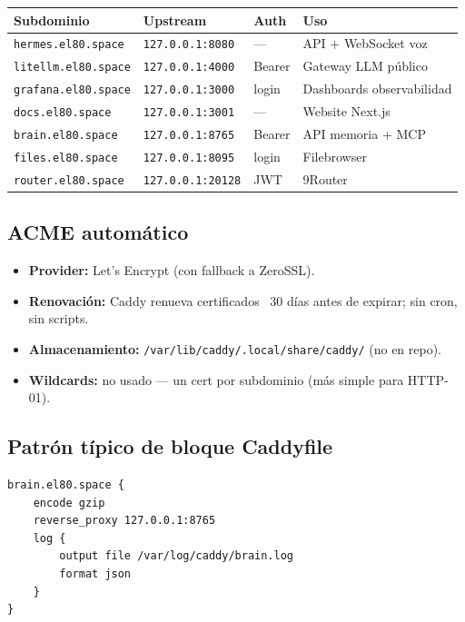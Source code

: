 \documentclass[11pt,a4paper]{article}
\begin{document}
\begin{center}
\begin{tabular}{|l|l|l|l|}
\hline
\rowcolor{hermesblue}\color{white}\textbf{Subdominio} & \color{white}\textbf{Upstream} & \color{white}\textbf{Auth} & \color{white}\textbf{Uso}\\
\hline
\texttt{hermes.el80.space} & \texttt{127.0.0.1:8080} & — & API + WebSocket voz\\
\texttt{litellm.el80.space} & \texttt{127.0.0.1:4000} & Bearer & Gateway LLM público\\
\texttt{grafana.el80.space} & \texttt{127.0.0.1:3000} & login & Dashboards observabilidad\\
\texttt{docs.el80.space} & \texttt{127.0.0.1:3001} & — & Website Next.js\\
\texttt{brain.el80.space} & \texttt{127.0.0.1:8765} & Bearer & API memoria + MCP\\
\texttt{files.el80.space} & \texttt{127.0.0.1:8095} & login & Filebrowser\\
\texttt{router.el80.space} & \texttt{127.0.0.1:20128} & JWT & 9Router\\
\hline
\end{tabular}
\end{center}

\subsection{ACME automático}

\begin{itemize}[leftmargin=*,itemsep=1pt]
\item \textbf{Provider:} Let's Encrypt (con fallback a ZeroSSL).
\item \textbf{Renovación:} Caddy renueva certificados ~30 días antes de expirar; sin cron, sin scripts.
\item \textbf{Almacenamiento:} \texttt{/var/lib/caddy/.local/share/caddy/} (no en repo).
\item \textbf{Wildcards:} no usado — un cert por subdominio (más simple para HTTP-01).
\end{itemize}

\subsection{Patrón típico de bloque Caddyfile}

\begin{lstlisting}[language=bashx]
brain.el80.space {
    encode gzip
    reverse_proxy 127.0.0.1:8765
    log {
        output file /var/log/caddy/brain.log
        format json
    }
}
\end{lstlisting}
\end{document}
